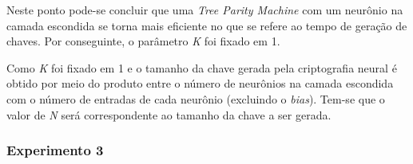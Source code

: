\documentclass[12pt]{article}
\begin{document}
                
                


                Neste ponto pode-se concluir que uma \textit{Tree Parity Machine} com um neurônio na camada escondida se torna mais eficiente no que se refere ao tempo de geração de chaves. Por conseguinte, o parâmetro \textit{K} foi fixado em 1.
                
                Como \textit{K} foi fixado em 1 e o tamanho da chave gerada pela criptografia neural é obtido por meio do produto entre o número de neurônios na camada escondida com o número de entradas de cada neurônio (excluindo o \textit{bias}). Tem-se que o valor de \textit{N} será correspondente ao tamanho da chave a ser gerada.
                
            \subsubsection{Experimento 3}
            \label{subsubsec:experimentoEpsilon}

                
\end{document}
